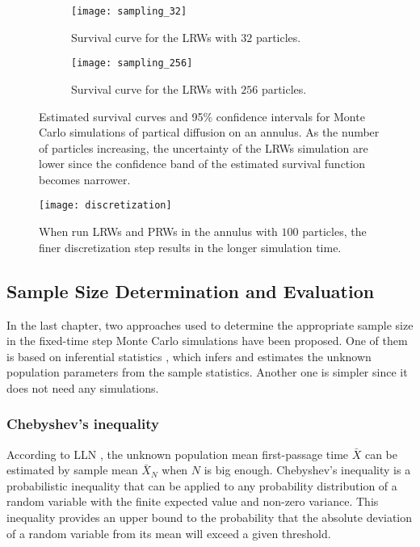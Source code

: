 \begin{figure}
  \begin{subfigure}{0.9\textwidth}
    \centering
    \texttt{[image: sampling\_32]}
    \caption{Survival curve for the LRWs with $32$ particles.\label{fig:annulus_32_particles}}
  \end{subfigure}
  \begin{subfigure}{0.9\textwidth}
    \centering
    \texttt{[image: sampling\_256]}
    \caption{Survival curve for the LRWs with $256$ particles. \label{fig:annulus_256_particles}}
  \end{subfigure}
  \caption{Estimated survival curves and 95\% confidence intervals for
    Monte Carlo simulations of partical diffusion on an annulus. As
    the number of particles increasing, the uncertainty of the LRWs
    simulation are lower since the confidence band of the estimated
    survival function becomes narrower.\label{fig:lrw_prw_annulus}}
\end{figure}



\begin{figure}
  \centering
  \texttt{[image: discretization]}
  \caption{When run LRWs and PRWs in the annulus with $100$ particles,
    the finer discretization step results in the longer simulation
    time.\label{fig:annulus_finer_steps}}
\end{figure}


\subsection{Sample Size Determination and Evaluation}

In the last chapter, two approaches used to determine the appropriate
sample size in the fixed-time step Monte Carlo simulations have been
proposed. One of them is based on inferential statistics
\cite{casella2002statistical}, which infers and estimates the unknown
population parameters from the sample statistics. Another one is
simpler since it does not need any simulations.

\subsubsection{Chebyshev's inequality}

According to LLN \cite{dekking2005modern}, the unknown population mean
first-passage time $\bar X$ can be estimated by sample mean $\bar X_N$
when $N$ is big enough. Chebyshev’s inequality
\cite{chebyshev1867valeurs} is a probabilistic inequality that can be
applied to any probability distribution of a random variable with the
finite expected value and non-zero variance. This inequality provides
an upper bound to the probability that the absolute deviation of a
random variable from its mean will exceed a given threshold.

